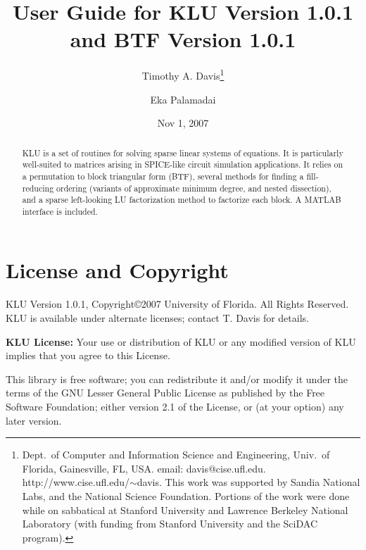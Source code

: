 \documentclass[11pt]{article}
\begin{document}

\title{User Guide for KLU Version 1.0.1 and BTF Version 1.0.1}
\author{
Timothy A. Davis\thanks{
Dept.~of Computer and Information Science and Engineering,
Univ.~of Florida, Gainesville, FL, USA.
email: davis@cise.ufl.edu.
http://www.cise.ufl.edu/$\sim$davis.
This work was supported by Sandia National Labs, and the National
Science Foundation.
Portions of the work were done while on sabbatical at Stanford University
and Lawrence Berkeley National Laboratory (with funding from Stanford
University and the SciDAC program).
}
\and Eka Palamadai}

\date{Nov 1, 2007}
\maketitle

\begin{abstract}
KLU is a set of routines for solving sparse linear systems of equations.
It is particularly well-suited to matrices arising in SPICE-like circuit
simulation applications.
It relies on a permutation to block triangular form (BTF), several methods
for finding a fill-reducing ordering (variants of approximate minimum degree,
and nested dissection), and a sparse left-looking LU factorization method
to factorize each block.  A MATLAB interface is included.
\end{abstract}

\newpage
\tableofcontents
\newpage

\section{License and Copyright}

KLU Version 1.0.1, Copyright\copyright 2007 University of Florida.
All Rights Reserved.
KLU is available under alternate licenses; contact T. Davis for details.

{\bf KLU License:}
    Your use or distribution of KLU or any modified version of
    KLU implies that you agree to this License.

    This library is free software; you can redistribute it and/or
    modify it under the terms of the GNU Lesser General Public
    License as published by the Free Software Foundation; either
    version 2.1 of the License, or (at your option) any later version.
\end{document}
